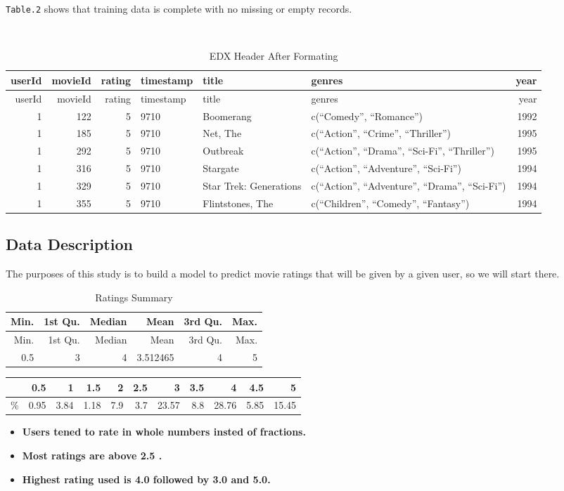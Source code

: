 \documentclass[]{article}
\providecommand{\tightlist}{%
  \setlength{\itemsep}{0pt}\setlength{\parskip}{0pt}}
\begin{document}
\texttt{Table.2} shows that training data is complete with no missing or
empty records.

\newpage

~~~

\begin{longtable}[]{@{}rrrlllr@{}}
\caption{EDX Header After Formating}\tabularnewline
\toprule
userId & movieId & rating & timestamp & title & genres &
year\tabularnewline
\midrule
\endfirsthead
\toprule
userId & movieId & rating & timestamp & title & genres &
year\tabularnewline
\midrule
\endhead
1 & 122 & 5 & 9710 & Boomerang & c(``Comedy'', ``Romance'') &
1992\tabularnewline
1 & 185 & 5 & 9710 & Net, The & c(``Action'', ``Crime'', ``Thriller'') &
1995\tabularnewline
1 & 292 & 5 & 9710 & Outbreak & c(``Action'', ``Drama'', ``Sci-Fi'',
``Thriller'') & 1995\tabularnewline
1 & 316 & 5 & 9710 & Stargate & c(``Action'', ``Adventure'', ``Sci-Fi'')
& 1994\tabularnewline
1 & 329 & 5 & 9710 & Star Trek: Generations & c(``Action'',
``Adventure'', ``Drama'', ``Sci-Fi'') & 1994\tabularnewline
1 & 355 & 5 & 9710 & Flintstones, The & c(``Children'', ``Comedy'',
``Fantasy'') & 1994\tabularnewline
\bottomrule
\end{longtable}

\subsection{Data Description}\label{data-description}

The purposes of this study is to build a model to predict movie ratings
that will be given by a given user, so we will start there.

\begin{longtable}[]{@{}rrrrrr@{}}
\caption{Ratings Summary}\tabularnewline
\toprule
Min. & 1st Qu. & Median & Mean & 3rd Qu. & Max.\tabularnewline
\midrule
\endfirsthead
\toprule
Min. & 1st Qu. & Median & Mean & 3rd Qu. & Max.\tabularnewline
\midrule
\endhead
0.5 & 3 & 4 & 3.512465 & 4 & 5\tabularnewline
\bottomrule
\end{longtable}

\begin{longtable}[]{@{}lrrrrrrrrrr@{}}
\toprule
& 0.5 & 1 & 1.5 & 2 & 2.5 & 3 & 3.5 & 4 & 4.5 & 5\tabularnewline
\midrule
\endhead
\% & 0.95 & 3.84 & 1.18 & 7.9 & 3.7 & 23.57 & 8.8 & 28.76 & 5.85 &
15.45\tabularnewline
\bottomrule
\end{longtable}

\begin{itemize}
\tightlist
\item
  \textbf{Users tened to rate in whole numbers insted of fractions.}
\item
  \textbf{Most ratings are above 2.5 .}
\item
  \textbf{Highest rating used is 4.0 followed by 3.0 and 5.0.}
\end{itemize}
\end{document}
